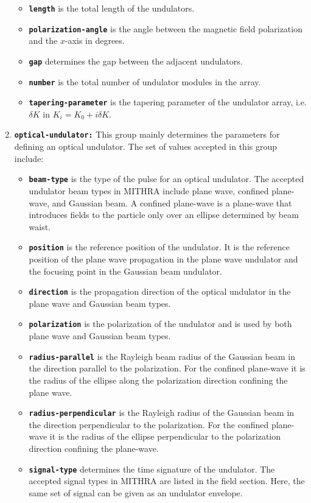 \begin{enumerate}
\begin{itemize}
	\item \textbf{\texttt{length}} is the total length of the undulators.
	\item \textbf{\texttt{polarization-angle}} is the angle between the magnetic field polarization and the $x$-axis in degrees.
	\item \textbf{\texttt{gap}} determines the gap between the adjacent undulators.
    \item \textbf{\texttt{number}} is the total number of undulator modules in the array.
    \item \textbf{\texttt{tapering-parameter}} is the tapering parameter of the undulator array, i.e. $\delta K$ in $K_i=K_0+i \delta K$. 
\end{itemize}
\item \textbf{\texttt{optical-undulator:}} This group mainly determines the parameters for defining an optical undulator. The set of values accepted in this group include:
\begin{itemize}
	\item \textbf{\texttt{beam-type}} is the type of the pulse for an optical undulator. The accepted undulator beam types in MITHRA include plane wave, confined plane-wave, and Gaussian beam. A confined plane-wave is a plane-wave that introduces fields to the particle only over an ellipse determined by beam waist.
	\item \textbf{\texttt{position}} is the reference position of the undulator. It is the reference position of the plane wave propagation in the plane wave undulator and the focusing point in the Gaussian beam undulator.
	\item \textbf{\texttt{direction}} is the propagation direction of the optical undulator in the plane wave and Gaussian beam types.
	\item \textbf{\texttt{polarization}} is the polarization of the undulator and is used by both plane wave and Gaussian beam types.
	\item \textbf{\texttt{radius-parallel}} is the Rayleigh beam radius of the Gaussian beam in the direction parallel to the polarization. For the confined plane-wave it is the radius of the ellipse along the polarization direction confining the plane wave.
	\item \textbf{\texttt{radius-perpendicular}} is the Rayleigh radius of the Gaussian beam in the direction perpendicular to the polarization. For the confined plane-wave it is the radius of the ellipse perpendicular to the polarization direction confining the plane-wave.
	\item \textbf{\texttt{signal-type}} determines the time signature of the undulator. The accepted signal types in MITHRA are listed in the field section. Here, the same set of signal can be given as an undulator envelope.

\end{itemize}
\end{enumerate}
